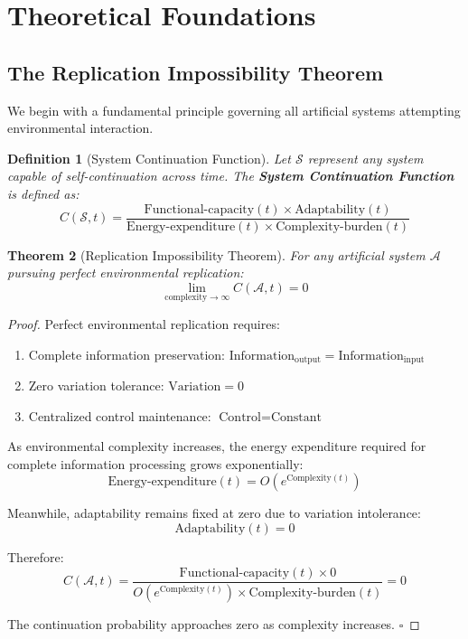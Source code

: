\documentclass[12pt,a4paper]{article}
\newtheorem{theorem}{Theorem}[section]
\newtheorem{definition}[theorem]{Definition}
\begin{document}
\section{Theoretical Foundations}

\subsection{The Replication Impossibility Theorem}

We begin with a fundamental principle governing all artificial systems attempting environmental interaction.

\begin{definition}[System Continuation Function]
Let $\mathcal{S}$ represent any system capable of self-continuation across time. The \textbf{System Continuation Function} is defined as:
$$C(\mathcal{S}, t) = \frac{\text{Functional-capacity}(t) \times \text{Adaptability}(t)}{\text{Energy-expenditure}(t) \times \text{Complexity-burden}(t)}$$
\end{definition}

\begin{theorem}[Replication Impossibility Theorem]
For any artificial system $\mathcal{A}$ pursuing perfect environmental replication:
$$\lim_{\text{complexity} \rightarrow \infty} C(\mathcal{A}, t) = 0$$
\end{theorem}

\begin{proof}
Perfect environmental replication requires:
\begin{enumerate}
\item Complete information preservation: $\text{Information}_{\text{output}} = \text{Information}_{\text{input}}$
\item Zero variation tolerance: $\text{Variation} = 0$
\item Centralized control maintenance: $\text{Control} = \text{Constant}$
\end{enumerate}

As environmental complexity increases, the energy expenditure required for complete information processing grows exponentially:
$$\text{Energy-expenditure}(t) = O(e^{\text{Complexity}(t)})$$

Meanwhile, adaptability remains fixed at zero due to variation intolerance:
$$\text{Adaptability}(t) = 0$$

Therefore:
$$C(\mathcal{A}, t) = \frac{\text{Functional-capacity}(t) \times 0}{O(e^{\text{Complexity}(t)}) \times \text{Complexity-burden}(t)} = 0$$

The continuation probability approaches zero as complexity increases. $\square$
\end{proof}
\end{document}
